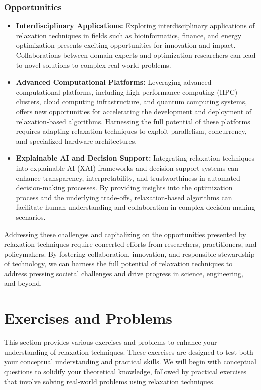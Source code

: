 \documentclass[12pt]{book} %
\begin{document}
\subsubsection{Opportunities}

\begin{itemize}
    \item \textbf{Interdisciplinary Applications:} Exploring interdisciplinary applications of relaxation techniques in fields such as bioinformatics, finance, and energy optimization presents exciting opportunities for innovation and impact. Collaborations between domain experts and optimization researchers can lead to novel solutions to complex real-world problems.
    
    \item \textbf{Advanced Computational Platforms:} Leveraging advanced computational platforms, including high-performance computing (HPC) clusters, cloud computing infrastructure, and quantum computing systems, offers new opportunities for accelerating the development and deployment of relaxation-based algorithms. Harnessing the full potential of these platforms requires adapting relaxation techniques to exploit parallelism, concurrency, and specialized hardware architectures.
    
    \item \textbf{Explainable AI and Decision Support:} Integrating relaxation techniques into explainable AI (XAI) frameworks and decision support systems can enhance transparency, interpretability, and trustworthiness in automated decision-making processes. By providing insights into the optimization process and the underlying trade-offs, relaxation-based algorithms can facilitate human understanding and collaboration in complex decision-making scenarios.
\end{itemize}

Addressing these challenges and capitalizing on the opportunities presented by relaxation techniques require concerted efforts from researchers, practitioners, and policymakers. By fostering collaboration, innovation, and responsible stewardship of technology, we can harness the full potential of relaxation techniques to address pressing societal challenges and drive progress in science, engineering, and beyond.

\section{Exercises and Problems}
This section provides various exercises and problems to enhance your understanding of relaxation techniques. These exercises are designed to test both your conceptual understanding and practical skills. We will begin with conceptual questions to solidify your theoretical knowledge, followed by practical exercises that involve solving real-world problems using relaxation techniques.
\end{document}
